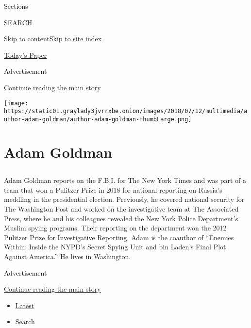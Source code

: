 Sections

SEARCH

\protect\hyperlink{site-content}{Skip to
content}\protect\hyperlink{site-index}{Skip to site index}

\href{https://myaccount.nytimes3xbfgragh.onion/auth/login?response_type=cookie\&client_id=vi}{}

\href{https://www.nytimes3xbfgragh.onion/section/todayspaper}{Today's
Paper}

Advertisement

\protect\hyperlink{after-top}{Continue reading the main story}

\texttt{[image: https://static01.graylady3jvrrxbe.onion/images/2018/07/12/multimedia/author-adam-goldman/author-adam-goldman-thumbLarge.png]}

\hypertarget{adam-goldman}{%
\section{Adam Goldman}\label{adam-goldman}}

\subsection{}

Adam Goldman reports on the F.B.I. for The New York Times and was part
of a team that won a Pulitzer Prize in 2018 for national reporting on
Russia's meddling in the presidential election. Previously, he covered
national security for The Washington Post and worked on the
investigative team at The Associated Press, where he and his colleagues
revealed the New York Police Department's Muslim spying programs. Their
reporting on the department won the 2012 Pulitzer Prize for
Investigative Reporting. Adam is the coauthor of ``Enemies Within:
Inside the NYPD's Secret Spying Unit and bin Laden's Final Plot Against
America.'' He lives in Washington.

Advertisement

\protect\hyperlink{after-mid1}{Continue reading the main story}

\begin{itemize}
\tightlist
\item
  \protect\hyperlink{stream-panel}{Latest}
\item
  Search
\end{itemize}

